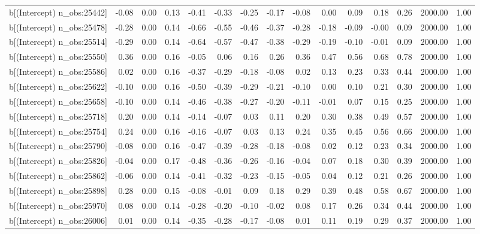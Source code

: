 \begin{table}[ht]
\begin{tabular}{rrrrrrrrrrrrrrr}
  b[(Intercept) n\_obs:25442] & -0.08 & 0.00 & 0.13 & -0.41 & -0.33 & -0.25 & -0.17 & -0.08 & 0.00 & 0.09 & 0.18 & 0.26 & 2000.00 & 1.00 \\ 
  b[(Intercept) n\_obs:25478] & -0.28 & 0.00 & 0.14 & -0.66 & -0.55 & -0.46 & -0.37 & -0.28 & -0.18 & -0.09 & -0.00 & 0.09 & 2000.00 & 1.00 \\ 
  b[(Intercept) n\_obs:25514] & -0.29 & 0.00 & 0.14 & -0.64 & -0.57 & -0.47 & -0.38 & -0.29 & -0.19 & -0.10 & -0.01 & 0.09 & 2000.00 & 1.00 \\ 
  b[(Intercept) n\_obs:25550] & 0.36 & 0.00 & 0.16 & -0.05 & 0.06 & 0.16 & 0.26 & 0.36 & 0.47 & 0.56 & 0.68 & 0.78 & 2000.00 & 1.00 \\ 
  b[(Intercept) n\_obs:25586] & 0.02 & 0.00 & 0.16 & -0.37 & -0.29 & -0.18 & -0.08 & 0.02 & 0.13 & 0.23 & 0.33 & 0.44 & 2000.00 & 1.00 \\ 
  b[(Intercept) n\_obs:25622] & -0.10 & 0.00 & 0.16 & -0.50 & -0.39 & -0.29 & -0.21 & -0.10 & 0.00 & 0.10 & 0.21 & 0.30 & 2000.00 & 1.00 \\ 
  b[(Intercept) n\_obs:25658] & -0.10 & 0.00 & 0.14 & -0.46 & -0.38 & -0.27 & -0.20 & -0.11 & -0.01 & 0.07 & 0.15 & 0.25 & 2000.00 & 1.00 \\ 
  b[(Intercept) n\_obs:25718] & 0.20 & 0.00 & 0.14 & -0.14 & -0.07 & 0.03 & 0.11 & 0.20 & 0.30 & 0.38 & 0.49 & 0.57 & 2000.00 & 1.00 \\ 
  b[(Intercept) n\_obs:25754] & 0.24 & 0.00 & 0.16 & -0.16 & -0.07 & 0.03 & 0.13 & 0.24 & 0.35 & 0.45 & 0.56 & 0.66 & 2000.00 & 1.00 \\ 
  b[(Intercept) n\_obs:25790] & -0.08 & 0.00 & 0.16 & -0.47 & -0.39 & -0.28 & -0.18 & -0.08 & 0.02 & 0.12 & 0.23 & 0.34 & 2000.00 & 1.00 \\ 
  b[(Intercept) n\_obs:25826] & -0.04 & 0.00 & 0.17 & -0.48 & -0.36 & -0.26 & -0.16 & -0.04 & 0.07 & 0.18 & 0.30 & 0.39 & 2000.00 & 1.00 \\ 
  b[(Intercept) n\_obs:25862] & -0.06 & 0.00 & 0.14 & -0.41 & -0.32 & -0.23 & -0.15 & -0.05 & 0.04 & 0.12 & 0.21 & 0.26 & 2000.00 & 1.00 \\ 
  b[(Intercept) n\_obs:25898] & 0.28 & 0.00 & 0.15 & -0.08 & -0.01 & 0.09 & 0.18 & 0.29 & 0.39 & 0.48 & 0.58 & 0.67 & 2000.00 & 1.00 \\ 
  b[(Intercept) n\_obs:25970] & 0.08 & 0.00 & 0.14 & -0.28 & -0.20 & -0.10 & -0.02 & 0.08 & 0.17 & 0.26 & 0.34 & 0.44 & 2000.00 & 1.00 \\ 
  b[(Intercept) n\_obs:26006] & 0.01 & 0.00 & 0.14 & -0.35 & -0.28 & -0.17 & -0.08 & 0.01 & 0.11 & 0.19 & 0.29 & 0.37 & 2000.00 & 1.00 \\ 

\end{tabular}
\end{table}
